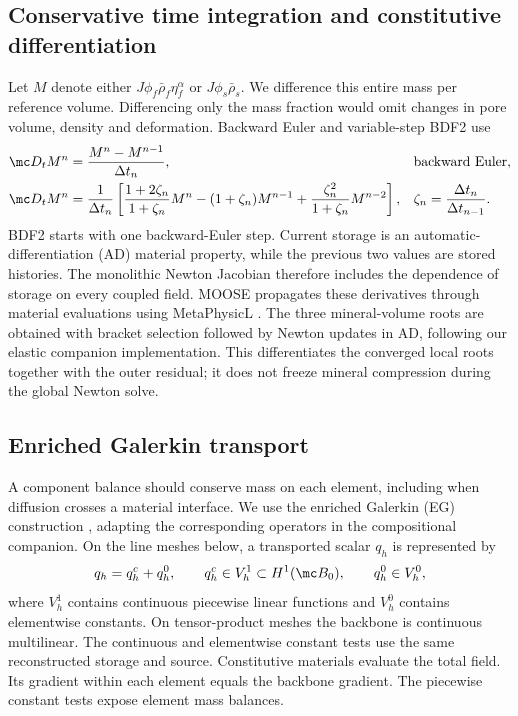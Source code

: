 \documentclass[11pt]{article}
\begin{document}
\subsection{Conservative time integration and constitutive differentiation}
Let \(M\) denote either \(J\phi_f\bar\rho_f\eta_f^\alpha\) or \(J\phi_s\bar\rho_s\). We difference this entire mass per reference volume. Differencing only the mass fraction would omit changes in pore volume, density and deformation. Backward Euler and variable-step BDF2 use
\begin{align}
 \mc D_tM^n&=\frac{M^n-M^{n-1}}{\Delta t_n}, &&\text{backward Euler},\label{eq:discrete_euler}\\
 \mc D_tM^n&=\frac1{\Delta t_n}\left[
 \frac{1+2\zeta_n}{1+\zeta_n}M^n-(1+\zeta_n)M^{n-1}
 +\frac{\zeta_n^2}{1+\zeta_n}M^{n-2}\right],
 &&\zeta_n=\frac{\Delta t_n}{\Delta t_{n-1}}.
 \label{eq:discrete_bdf}
\end{align}
BDF2 starts with one backward-Euler step. Current storage is an automatic-differentiation (AD) material property, while the previous two values are stored histories. The monolithic Newton Jacobian therefore includes the dependence of storage on every coupled field. MOOSE propagates these derivatives through material evaluations using MetaPhysicL \citep{moosead}. The three mineral-volume roots are obtained with bracket selection followed by Newton updates in AD, following our elastic companion implementation. This differentiates the converged local roots together with the outer residual; it does not freeze mineral compression during the global Newton solve.

\subsection{Enriched Galerkin transport}
A component balance should conserve mass on each element, including when diffusion crosses a material interface. We use the enriched Galerkin (EG) construction \citep{eg2016}, adapting the corresponding operators in the compositional companion. On the line meshes below, a transported scalar \(q_h\) is represented by
\begin{equation}
 q_h=q_h^c+q_h^0,\qquad q_h^c\in V_h^1\subset H^1(\mc B_0),
 \qquad q_h^0\in V_h^0,
 \label{eq:eg_space}
\end{equation}
where \(V_h^1\) contains continuous piecewise linear functions and \(V_h^0\) contains elementwise constants. On tensor-product meshes the backbone is continuous multilinear. The continuous and elementwise constant tests use the same reconstructed storage and source. Constitutive materials evaluate the total field. Its gradient within each element equals the backbone gradient. The piecewise constant tests expose element mass balances.
\end{document}
